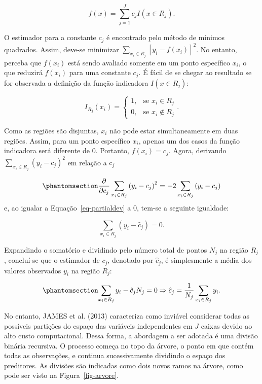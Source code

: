 \documentclass[
  12pt,
  a4paper,
]{scrreprt}
\begin{document}
\[
f\left(x\right) = \sum^J_{j=1}c_j I\left(x \in R_j \right)\text{.}
\]

O estimador para a constante \(c_j\) é encontrado pelo método de mínimos
quadrados. Assim, deve-se minimizar
\(\sum_{x_i \in R_j} \left[y_i - f\left(x_i\right)\right]^2\). No
entanto, perceba que \(f\left(x_i\right)\) está sendo avaliado somente
em um ponto específico \(x_i\), o que reduzirá \(f\left(x_i\right)\)
para uma constante \(c_j\). É fácil de se chegar ao resultado se for
observada a definição da função indicadora \(I\left(x \in R_j\right)\):

\[
I_{R_j}(x_i) =
\begin{cases}
    1,& \text{se } x_i \in R_j \\
    0,& \text{se } x_i \notin R_j
\end{cases}\text{.}
\]

Como as regiões são disjuntas, \(x_i\) não pode estar simultaneamente em
duas regiões. Assim, para um ponto específico \(x_i\), apenas um dos
casos da função indicadora será diferente de 0. Portanto,
\(f\left(x_i\right) = c_j\). Agora, derivando
\(\sum_{x_i \in R_j}\left(y_i - c_j\right)^2\) em relação a \(c_j\)

\begin{equation}\phantomsection\label{eq-partialdev}{
\frac{\partial}{\partial{c_j}}\sum_{x_i \in R_j} \left(y_i - c_j\right)^2 = -2\sum_{x_i \in R_j} \left(y_i - c_j\right)
}\end{equation} e, ao igualar a Equação~\ref{eq-partialdev} a 0, tem-se
a seguinte igualdade:

\[
\sum_{x_i \in R_j} \left(y_i - \hat{c}_j\right) = 0\text{.}
\]

Expandindo o somatório e dividindo pelo número total de pontos \(N_j\)
na região \(R_j\), concluí-se que o estimador de \(c_j\), denotado por
\(\hat{c}_j\), é simplesmente a média dos valores observados \(y_i\) na
região \(R_j\):

\begin{equation}\phantomsection\label{eq-estimacjdev}{
\sum_{x_i \in R_j} y_i - \hat{c}_j N_j = 0 \Rightarrow \hat{c}_j = \frac{1}{N_{j}}\sum_{x_i \in R_j} y_i\text{.}
}\end{equation}

\vspace{12pt}

No entanto, JAMES et al. (2013) caracteriza como inviável considerar
todas as possíveis partições do espaço das variáveis independentes em
\(J\) caixas devido ao alto custo computacional. Dessa forma, a
abordagem a ser adotada é uma divisão binária recursiva. O processo
começa no topo da árvore, o ponto em que contém todas as observações, e
continua sucessivamente dividindo o espaço dos preditores. As divisões
são indicadas como dois novos ramos na árvore, como pode ser visto na
Figura~\ref{fig-arvore}.
\end{document}
